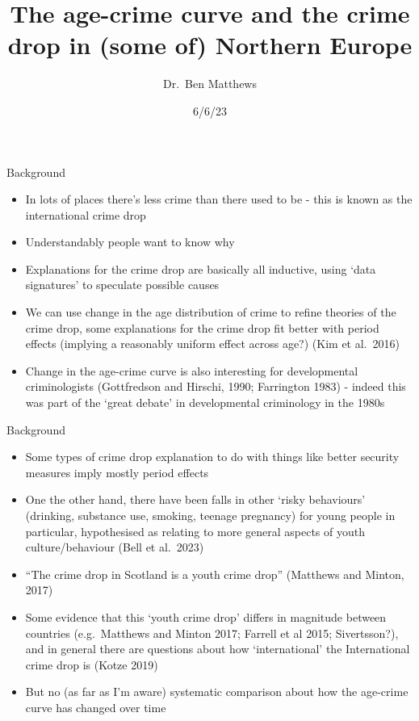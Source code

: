 \documentclass[
  ignorenonframetext,
]{beamer}
\title{The age-crime curve and the crime drop in (some of) Northern
Europe}
\author{Dr.~Ben Matthews}
\date{6/6/23}
\institute{University of Stirling}
\begin{document}
\frame{\titlepage}
\ifdefined\Shaded\renewenvironment{Shaded}{\begin{tcolorbox}[sharp corners, interior hidden, borderline west={3pt}{0pt}{shadecolor}, boxrule=0pt, breakable, frame hidden, enhanced]}{\end{tcolorbox}}\fi

\begin{frame}{Background}
\protect\hypertarget{background}{}
\begin{itemize}
\item
  In lots of places there's less crime than there used to be - this is
  known as the international crime drop
\item
  Understandably people want to know why
\item
  Explanations for the crime drop are basically all inductive, using
  `data signatures' to speculate possible causes
\item
  We can use change in the age distribution of crime to refine theories
  of the crime drop, some explanations for the crime drop fit better
  with period effects (implying a reasonably uniform effect across age?)
  (Kim et al.~2016)
\item
  Change in the age-crime curve is also interesting for developmental
  criminologists (Gottfredson and Hirschi, 1990; Farrington 1983) -
  indeed this was part of the `great debate' in developmental
  criminology in the 1980s
\end{itemize}
\end{frame}

\begin{frame}{Background}
\protect\hypertarget{background-1}{}
\begin{itemize}
\item
  Some types of crime drop explanation to do with things like better
  security measures imply mostly period effects
\item
  One the other hand, there have been falls in other `risky behaviours'
  (drinking, substance use, smoking, teenage pregnancy) for young people
  in particular, hypothesised as relating to more general aspects of
  youth culture/behaviour (Bell et al.~2023)
\item
  ``The crime drop in Scotland is a youth crime drop'' (Matthews and
  Minton, 2017)
\item
  Some evidence that this `youth crime drop' differs in magnitude
  between countries (e.g.~Matthews and Minton 2017; Farrell et al 2015;
  Sivertsson?), and in general there are questions about how
  `international' the International crime drop is (Kotze 2019)
\item
  But no (as far as I'm aware) systematic comparison about how the
  age-crime curve has changed over time
\end{itemize}
\end{frame}
\end{document}
